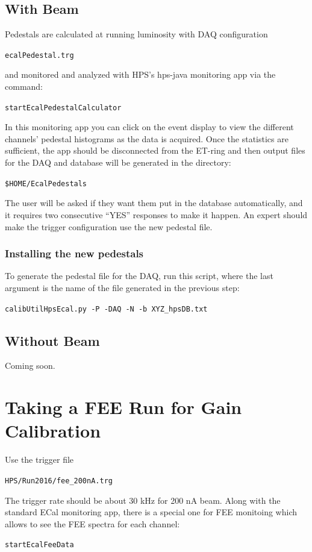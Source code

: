\documentclass[12pt]{article}
\begin{document}
   \subsection{With Beam}
   Pedestals are calculated at running luminosity with DAQ configuration \begin{center}\texttt{ecalPedestal.trg}\end{center} and monitored and analyzed with HPS's hps-java monitoring app via the command:
       \begin{center}\texttt{startEcalPedestalCalculator}\end{center}
       In this monitoring app you can click on the event display to view the different channels' pedestal histograms as the data is acquired.  Once the statistics are sufficient, the app should be disconnected from the ET-ring and then output files for the DAQ and database will be generated in the directory:\begin{center}\texttt{\$HOME/EcalPedestals}\end{center}  The user will be asked if they want them put in the database automatically, and it requires two consecutive ``YES'' responses to make it happen.  An expert should make the trigger configuration use the new pedestal file.

         \subsubsection{Installing the new pedestals}
      To generate the pedestal file for the DAQ, run this script, where the last argument is the name of the file generated in the previous step:
         \begin{center}\texttt{calibUtilHpsEcal.py -P -DAQ -N -b XYZ\_hpsDB.txt}\end{center}

  \subsection{Without Beam}
  Coming soon.

    \section{Taking a FEE Run for Gain Calibration}
Use the trigger file
\begin{center}\texttt{HPS/Run2016/fee\_200nA.trg}\end{center}
  The trigger rate should be about 30 kHz for 200 nA beam.  Along with the standard ECal monitoring app, there is a special one for FEE monitoing which allows to see the FEE spectra for each channel:
\begin{center}\texttt{startEcalFeeData}\end{center}
\end{document}
